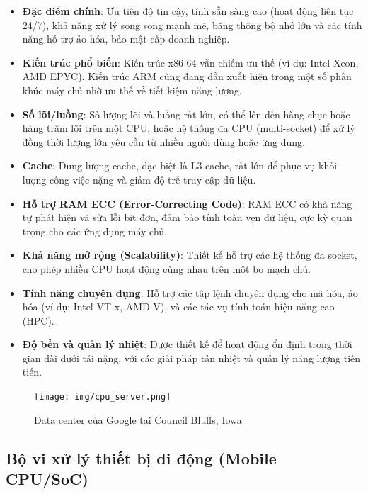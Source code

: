 \begin{itemize}
    \item \textbf{Đặc điểm chính}: Ưu tiên độ tin cậy, tính sẵn sàng cao (hoạt động liên tục 24/7), khả năng xử lý song song mạnh mẽ, băng thông bộ nhớ lớn và các tính năng hỗ trợ ảo hóa, bảo mật cấp doanh nghiệp.
    
    \item \textbf{Kiến trúc phổ biến}: Kiến trúc x86-64 vẫn chiếm ưu thế (ví dụ: Intel Xeon, AMD EPYC). Kiến trúc ARM cũng đang dần xuất hiện trong một số phân khúc máy chủ nhờ ưu thế về tiết kiệm năng lượng.

    \item \textbf{Số lõi/luồng}: Số lượng lõi và luồng rất lớn, có thể lên đến hàng chục hoặc hàng trăm lõi trên một CPU, hoặc hệ thống đa CPU (multi-socket) để xử lý đồng thời lượng lớn yêu cầu từ nhiều người dùng hoặc ứng dụng.

    \item \textbf{Cache}: Dung lượng cache, đặc biệt là L3 cache, rất lớn để phục vụ khối lượng công việc nặng và giảm độ trễ truy cập dữ liệu.

    \item \textbf{Hỗ trợ RAM ECC (Error-Correcting Code)}: RAM ECC có khả năng tự phát hiện và sửa lỗi bit đơn, đảm bảo tính toàn vẹn dữ liệu, cực kỳ quan trọng cho các ứng dụng máy chủ.

    \item \textbf{Khả năng mở rộng (Scalability)}: Thiết kế hỗ trợ các hệ thống đa socket, cho phép nhiều CPU hoạt động cùng nhau trên một bo mạch chủ.

    \item \textbf{Tính năng chuyên dụng}: Hỗ trợ các tập lệnh chuyên dụng cho mã hóa, ảo hóa (ví dụ: Intel VT-x, AMD-V), và các tác vụ tính toán hiệu năng cao (HPC).

    \item \textbf{Độ bền và quản lý nhiệt}: Được thiết kế để hoạt động ổn định trong thời gian dài dưới tải nặng, với các giải pháp tản nhiệt và quản lý năng lượng tiên tiến.
\end{itemize}

\begin{figure}[H]
    \centering
    \texttt{[image: img/cpu\_server.png]}
    \caption{Data center của Google tại Council Bluffs, Iowa}
\end{figure}

\subsection{Bộ vi xử lý thiết bị di động (Mobile CPU/SoC)}

